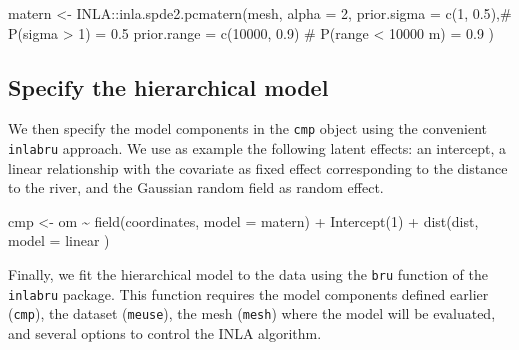 \documentclass[
  a4paper,
]{article}
\newenvironment{Shaded}{\begin{snugshade}}{\end{snugshade}}
\newcommand{\AttributeTok}[1]{\textcolor[rgb]{0.40,0.45,0.13}{#1}}
\newcommand{\CommentTok}[1]{\textcolor[rgb]{0.37,0.37,0.37}{#1}}
\newcommand{\DecValTok}[1]{\textcolor[rgb]{0.68,0.00,0.00}{#1}}
\newcommand{\FloatTok}[1]{\textcolor[rgb]{0.68,0.00,0.00}{#1}}
\newcommand{\FunctionTok}[1]{\textcolor[rgb]{0.28,0.35,0.67}{#1}}
\newcommand{\NormalTok}[1]{\textcolor[rgb]{0.00,0.23,0.31}{#1}}
\newcommand{\OtherTok}[1]{\textcolor[rgb]{0.00,0.23,0.31}{#1}}
\newcommand{\SpecialCharTok}[1]{\textcolor[rgb]{0.37,0.37,0.37}{#1}}
\newcommand{\StringTok}[1]{\textcolor[rgb]{0.13,0.47,0.30}{#1}}
\begin{document}
\begin{Shaded}
\begin{Highlighting}[]
\NormalTok{matern }\OtherTok{\textless{}{-}}
\NormalTok{  INLA}\SpecialCharTok{::}\FunctionTok{inla.spde2.pcmatern}\NormalTok{(mesh,}
                      \AttributeTok{alpha =} \DecValTok{2}\NormalTok{,}
                      \AttributeTok{prior.sigma =} \FunctionTok{c}\NormalTok{(}\DecValTok{1}\NormalTok{, }\FloatTok{0.5}\NormalTok{),}\CommentTok{\# P(sigma \textgreater{} 1) = 0.5}
                      \AttributeTok{prior.range =} \FunctionTok{c}\NormalTok{(}\DecValTok{10000}\NormalTok{, }\FloatTok{0.9}\NormalTok{)  }\CommentTok{\# P(range \textless{} 10000 m) = 0.9}
\NormalTok{  )}
\end{Highlighting}
\end{Shaded}

\hypertarget{specify-the-hierarchical-model}{%
\subsection{Specify the hierarchical
model}\label{specify-the-hierarchical-model}}

We then specify the model components in the \texttt{cmp} object using
the convenient \texttt{inlabru} approach. We use as example the
following latent effects: an intercept, a linear relationship with the
covariate as fixed effect corresponding to the distance to the river,
and the Gaussian random field as random effect.

\begin{Shaded}
\begin{Highlighting}[]
\NormalTok{cmp }\OtherTok{\textless{}{-}}\NormalTok{ om }\SpecialCharTok{\textasciitilde{}} 
  \FunctionTok{field}\NormalTok{(coordinates, }\AttributeTok{model =}\NormalTok{ matern) }\SpecialCharTok{+} 
  \FunctionTok{Intercept}\NormalTok{(}\DecValTok{1}\NormalTok{) }\SpecialCharTok{+} 
  \FunctionTok{dist}\NormalTok{(dist, }\AttributeTok{model =} \StringTok{\textquotesingle{}linear\textquotesingle{}}\NormalTok{ )     }
\end{Highlighting}
\end{Shaded}

Finally, we fit the hierarchical model to the data using the
\texttt{bru} function of the \texttt{inlabru} package. This function
requires the model components defined earlier (\texttt{cmp}), the
dataset (\texttt{meuse}), the mesh (\texttt{mesh}) where the model will
be evaluated, and several options to control the INLA algorithm.
\end{document}
